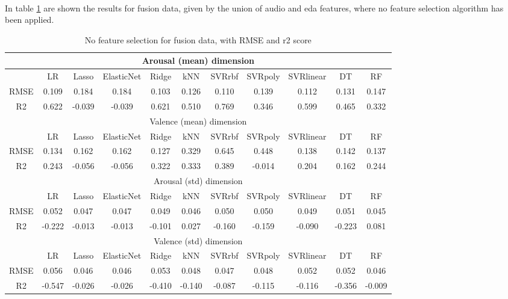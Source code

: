 \\
In table \ref{table:fusion_no_fs} are shown the results for fusion data, given by the union of audio and \gls{eda} features, where no feature selection algorithm has been applied.
\begin{table}[h!]
\begin{adjustwidth}{-3cm}{-1cm}
	\centering
	\begin{tabular}{|c|c|c|c|c|c|c|c|c|c|c|}
		\hline \multicolumn{11}{|c|}{Arousal (mean) dimension} \\
		\hline & LR & Lasso & ElasticNet & Ridge & kNN & SVRrbf & SVRpoly & SVRlinear & DT & RF \\
		\hline RMSE & 0.109 & 0.184 & 0.184 & \cellcolor{yellow}0.103 & 0.126 & 0.110 & 0.139 & 0.112 & 0.131 & 0.147 \\
		\hline R2 & 0.622 & -0.039 & -0.039 & 0.621 & 0.510 & \cellcolor{yellow}0.769 & 0.346 & 0.599 & 0.465 & 0.332 \\
		\hline \hline  \multicolumn{11}{|c|}{Valence (mean) dimension} \\
		\hline & LR & Lasso & ElasticNet & Ridge & kNN & SVRrbf & SVRpoly & SVRlinear & DT & RF \\
		\hline RMSE & 0.134 & 0.162 & 0.162 & 0.127 & 0.329 & \cellcolor{yellow}0.645 & 0.448 & 0.138 & 0.142 & 0.137 \\
		\hline R2 & 0.243 & -0.056 & -0.056 & 0.322 & 0.333 & \cellcolor{yellow}0.389 & -0.014 & 0.204 & 0.162 & 0.244 \\
		\hline \hline  \multicolumn{11}{|c|}{Arousal (std) dimension} \\
		\hline & LR & Lasso & ElasticNet & Ridge & kNN & SVRrbf & SVRpoly & SVRlinear & DT & RF \\
		\hline RMSE & 0.052 & 0.047 & 0.047 & 0.049 & \cellcolor{yellow}0.046 & 0.050 & 0.050 & 0.049 & 0.051 & 0.045 \\
		\hline R2 & -0.222 & -0.013 & -0.013 & -0.101 & 0.027 & -0.160 & -0.159 & -0.090 & -0.223 & 0.081 \\
		\hline \hline  \multicolumn{11}{|c|}{Valence (std) dimension} \\
		\hline & LR & Lasso & ElasticNet & Ridge & kNN & SVRrbf & SVRpoly & SVRlinear & DT & RF \\
		\hline RMSE & 0.056 & \cellcolor{yellow}0.046 & \cellcolor{yellow}0.046 & 0.053 & 0.048 & 0.047 & 0.048 & 0.052 & 0.052 & 0.046 \\
		\hline R2 & -0.547 & -0.026 & -0.026 & -0.410 & -0.140 & -0.087 & -0.115 & -0.116 & -0.356 & \cellcolor{yellow}-0.009 \\
		\hline
	\end{tabular}
	\end{adjustwidth}
	\caption{No feature selection for fusion data, with RMSE and r2 score}
	\label{table:fusion_no_fs}
\end{table}
\newpage
